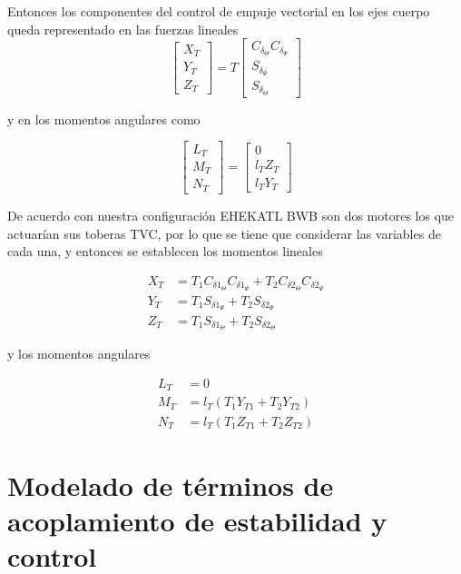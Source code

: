 Entonces los componentes del control de empuje vectorial en los ejes cuerpo queda representado en las fuerzas lineales 
\begin{equation}
\begin{bmatrix}
X_{T} \\
Y_{T} \\
Z_{T}
\end{bmatrix}
=
T
\begin{bmatrix}
C_{\delta_{\Theta}} C_{\delta_{\Psi}} \\
S_{\delta_{\Psi}} \\
S_{\delta_{\Theta}}
\end{bmatrix}
\end{equation}

y en los momentos angulares como

\begin{equation}
\begin{bmatrix}
L_{T} \\
M_{T} \\
N_{T}
\end{bmatrix}
=
\begin{bmatrix}
0 \\
l_T Z_{T} \\
l_T Y_{T}
\end{bmatrix}
\end{equation}

De acuerdo con nuestra configuración EHEKATL BWB son dos motores los que actuarían sus toberas TVC, por lo que se tiene que considerar las variables de cada una, y entonces se establecen los momentos lineales

\begin{align}
    X_T &= T_{1} C_{\delta1_{\Theta}} C_{\delta1_{\Psi}} + T_{2} C_{\delta2_{\Theta}} C_{\delta2_{\Psi}} \\
    Y_T &= T_{1} S_{\delta1_{\Psi}} + T_{2} S_{\delta2_{\Psi}} \\
    Z_T &= T_{1} S_{\delta1_{\Theta}} + T_{2} S_{\delta2_{\Theta}}
\end{align}

y los momentos angulares

\begin{align}
    L_T &= 0 \\
    M_T &= l_T(T_1 Y_{T1} + T_2 Y_{T2}) \\
    N_T &= l_T(T_1 Z_{T1} + T_2 Z_{T2})
\end{align}

\section{Modelado de términos de acoplamiento de estabilidad y control}

